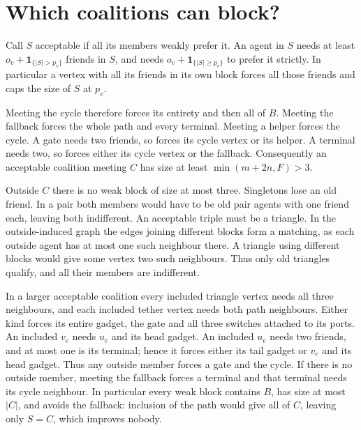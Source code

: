 \documentclass[11pt,a4paper]{amsart}
\begin{document}
\section{Which coalitions can block?}
Call $S$ acceptable if all its members weakly prefer it. An agent in $S$ needs at least $o_v+\mathbf1_{\{|S|>p_v\}}$ friends in $S$, and needs $o_v+\mathbf1_{\{|S|\ge p_v\}}$ to prefer it strictly. In particular a vertex with all its friends in its own block forces all those friends and caps the size of $S$ at $p_v$.

Meeting the cycle therefore forces its entirety and then all of $B$. Meeting the fallback forces the whole path and every terminal. Meeting a helper forces the cycle. A gate needs two friends, so forces its cycle vertex or its helper. A terminal needs two, so forces either its cycle vertex or the fallback. Consequently an acceptable coalition meeting $C$ has size at least $\min(m+2n,F)>3$.

Outside $C$ there is no weak block of size at most three. Singletons lose an old friend. In a pair both members would have to be old pair agents with one friend each, leaving both indifferent. An acceptable triple must be a triangle. In the outside-induced graph the edges joining different blocks form a matching, as each outside agent has at most one such neighbour there. A triangle using different blocks would give some vertex two such neighbours. Thus only old triangles qualify, and all their members are indifferent.

In a larger acceptable coalition every included triangle vertex needs all three neighbours, and each included tether vertex needs both path neighbours. Either kind forces its entire gadget, the gate and all three switches attached to its ports. An included $v_e$ needs $u_e$ and its head gadget. An included $u_e$ needs two friends, and at most one is its terminal; hence it forces either its tail gadget or $v_e$ and its head gadget. Thus any outside member forces a gate and the cycle. If there is no outside member, meeting the fallback forces a terminal and that terminal needs its cycle neighbour. In particular every weak block contains $B$, has size at most $|C|$, and avoids the fallback: inclusion of the path would give all of $C$, leaving only $S=C$, which improves nobody.
\end{document}
